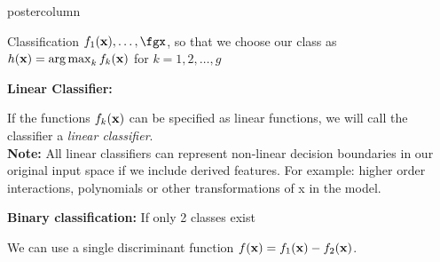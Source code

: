 \documentclass{beamer}
\begin{document}
\begin{frame}[fragile]{}
\begin{columns}
\begin{column}{.31\textwidth}
\begin{beamercolorbox}[center]{postercolumn}
\begin{minipage}{.98\textwidth}
{\begin{myblock}{Classification}
						\hspace*{1ex}$f_1(\xv), \ldots, \fgx$, so that we choose our class as $h(\mathbf{x}) = \operatorname{arg\,max}_k f_{k}(\mathbf{x})$ \hspace*{1ex}for $k = 1, 2,\ldots, g$
						
						\vspace*{1ex}
						
						
							\textbf{Linear Classifier:}
						
						\hspace*{1ex}If the functions $f_{k}(\mathbf{x})$ can be specified as linear functions, we will call \hspace*{1ex}the classifier a \emph{linear classifier}.\\
						
						\hspace*{1ex}\textbf{Note: }All linear classifiers can represent non-linear decision boundaries \hspace*{1ex}in our original input space if we include derived features. For example: \hspace*{1ex}higher order interactions, polynomials or other transformations of x in \hspace*{1ex}the model.
			
			    \vspace*{1ex}
			
						
							 \textbf{Binary classification: }If only 2 classes exist
						
						\hspace*{1ex}We can use a single discriminant function $f(\mathbf{x}) = f_{1}(\mathbf{x}) - f_{2}(\mathbf{x})$.
          \end{myblock}
				}
			\end{minipage}
		\end{beamercolorbox}
	\end{column}
\end{columns}
\end{frame}
\end{document}
